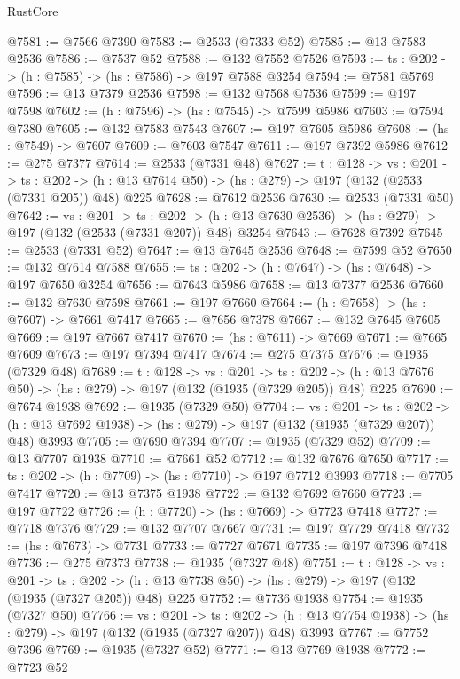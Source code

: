 \begin{lexlean}{RustCore}
\begin{coremodule}
@7581 := @7566 @7390
@7583 := @2533 (@7333 @52)
@7585 := @13 @7583 @2536
@7586 := @7537 @52
@7588 := @132 @7552 @7526
@7593 := {ts : @202} -> (h : @7585) -> (hs : @7586) -> @197 @7588 @3254
@7594 := @7581 @5769
@7596 := @13 @7379 @2536
@7598 := @132 @7568 @7536
@7599 := @197 @7598
@7602 := (h : @7596) -> (hs : @7545) -> @7599 @5986
@7603 := @7594 @7380
@7605 := @132 @7583 @7543
@7607 := @197 @7605 @5986
@7608 := (hs : @7549) -> @7607
@7609 := @7603 @7547
@7611 := @197 @7392 @5986
@7612 := @275 @7377
@7614 := @2533 (@7331 @48)
@7627 := {t : @128} ->
  {vs : @201} ->
  {ts : @202} -> (h : @13 @7614 @50) -> (hs : @279) -> @197 (@132 (@2533 (@7331 @205)) @48) @225
@7628 := @7612 @2536
@7630 := @2533 (@7331 @50)
@7642 := {vs : @201} ->
  {ts : @202} -> (h : @13 @7630 @2536) -> (hs : @279) -> @197 (@132 (@2533 (@7331 @207)) @48) @3254
@7643 := @7628 @7392
@7645 := @2533 (@7331 @52)
@7647 := @13 @7645 @2536
@7648 := @7599 @52
@7650 := @132 @7614 @7588
@7655 := {ts : @202} -> (h : @7647) -> (hs : @7648) -> @197 @7650 @3254
@7656 := @7643 @5986
@7658 := @13 @7377 @2536
@7660 := @132 @7630 @7598
@7661 := @197 @7660
@7664 := (h : @7658) -> (hs : @7607) -> @7661 @7417
@7665 := @7656 @7378
@7667 := @132 @7645 @7605
@7669 := @197 @7667 @7417
@7670 := (hs : @7611) -> @7669
@7671 := @7665 @7609
@7673 := @197 @7394 @7417
@7674 := @275 @7375
@7676 := @1935 (@7329 @48)
@7689 := {t : @128} ->
  {vs : @201} ->
  {ts : @202} -> (h : @13 @7676 @50) -> (hs : @279) -> @197 (@132 (@1935 (@7329 @205)) @48) @225
@7690 := @7674 @1938
@7692 := @1935 (@7329 @50)
@7704 := {vs : @201} ->
  {ts : @202} -> (h : @13 @7692 @1938) -> (hs : @279) -> @197 (@132 (@1935 (@7329 @207)) @48) @3993
@7705 := @7690 @7394
@7707 := @1935 (@7329 @52)
@7709 := @13 @7707 @1938
@7710 := @7661 @52
@7712 := @132 @7676 @7650
@7717 := {ts : @202} -> (h : @7709) -> (hs : @7710) -> @197 @7712 @3993
@7718 := @7705 @7417
@7720 := @13 @7375 @1938
@7722 := @132 @7692 @7660
@7723 := @197 @7722
@7726 := (h : @7720) -> (hs : @7669) -> @7723 @7418
@7727 := @7718 @7376
@7729 := @132 @7707 @7667
@7731 := @197 @7729 @7418
@7732 := (hs : @7673) -> @7731
@7733 := @7727 @7671
@7735 := @197 @7396 @7418
@7736 := @275 @7373
@7738 := @1935 (@7327 @48)
@7751 := {t : @128} ->
  {vs : @201} ->
  {ts : @202} -> (h : @13 @7738 @50) -> (hs : @279) -> @197 (@132 (@1935 (@7327 @205)) @48) @225
@7752 := @7736 @1938
@7754 := @1935 (@7327 @50)
@7766 := {vs : @201} ->
  {ts : @202} -> (h : @13 @7754 @1938) -> (hs : @279) -> @197 (@132 (@1935 (@7327 @207)) @48) @3993
@7767 := @7752 @7396
@7769 := @1935 (@7327 @52)
@7771 := @13 @7769 @1938
@7772 := @7723 @52

\end{coremodule}
\end{lexlean}
